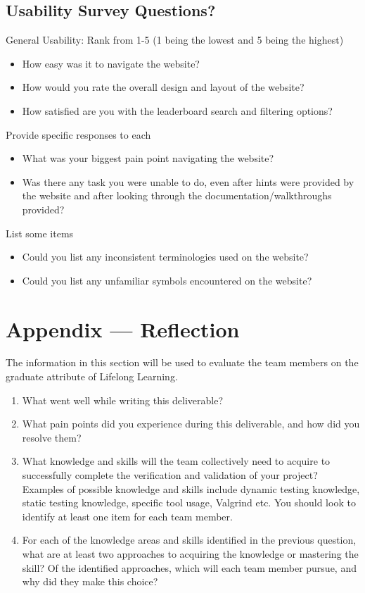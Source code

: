 \documentclass[12pt, titlepage]{article}
\begin{document}
\subsection{Usability Survey Questions?}

General Usability: Rank from 1-5 (1 being the lowest and 5 being the highest)
\begin{itemize}
    \item How easy was it to navigate the website?
    \item How would you rate the overall design and layout of the website?
    \item How satisfied are you with the leaderboard search and filtering options?
\end{itemize}
Provide specific responses to each
\begin{itemize}
    \item What was your biggest pain point navigating 
    the website?
    \item Was there any task you were unable to do, even after hints were provided by the website and after looking through the documentation/walkthroughs provided?
\end{itemize}
List some items
\begin{itemize}
    \item Could you list any inconsistent terminologies used on the website?
    \item Could you list any unfamiliar symbols encountered on the website?
\end{itemize}


\newpage{}
\section*{Appendix --- Reflection}

The information in this section will be used to evaluate the team members on the
graduate attribute of Lifelong Learning.



\begin{enumerate}
  \item What went well while writing this deliverable? 
  \item What pain points did you experience during this deliverable, and how
    did you resolve them?
  \item What knowledge and skills will the team collectively need to acquire to
  successfully complete the verification and validation of your project?
  Examples of possible knowledge and skills include dynamic testing knowledge,
  static testing knowledge, specific tool usage, Valgrind etc.  You should look to
  identify at least one item for each team member.
  \item For each of the knowledge areas and skills identified in the previous
  question, what are at least two approaches to acquiring the knowledge or
  mastering the skill?  Of the identified approaches, which will each team
  member pursue, and why did they make this choice?
\end{enumerate}
\end{document}

